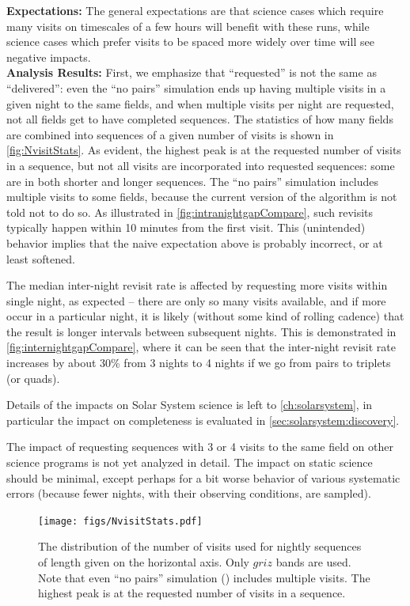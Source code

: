 {\bf Expectations:} The general expectations are that science cases
which require many visits on timescales of a few hours will benefit
with these runs, while science cases which prefer visits to be spaced
more widely over time will see negative impacts.\\

{\bf Analysis Results:}
First, we emphasize that ``requested'' is not the same as
``delivered'': even the ``no pairs''
simulation  ends
up having multiple visits in a given night to the same fields, and
when multiple visits per night are requested, not all fields get to
have completed sequences. The statistics of how many fields are
combined into sequences of a given number of visits is shown in
\autoref{fig:NvisitStats}.  As evident, the highest peak is at the
requested number of visits in a sequence, but not all visits are
incorporated into requested sequences: some are in both shorter and
longer sequences. The ``no pairs'' simulation includes
multiple visits to some fields, because the current
version of the algorithm is not told not to do so. As illustrated in
\autoref{fig:intranightgapCompare}, such revisits typically happen
within 10 minutes from the first visit. This (unintended) behavior
implies that the naive expectation above is probably incorrect, or at
least softened.

The median inter-night revisit rate is affected by requesting more
visits within single night, as expected -- there are only so many
visits available, and if more occur in a particular night, it is
likely (without some kind of rolling cadence) that the result is
longer intervals between subsequent nights. This is demonstrated in
\autoref{fig:internightgapCompare}, where it can be seen that the
inter-night revisit rate increases by about 30\% from 3 nights to 4
nights if we go from pairs to triplets (or quads).

Details of the impacts on Solar System science is
left to \autoref{ch:solarsystem}, in particular the impact on
completeness is evaluated in \autoref{sec:solarsystem:discovery}.

The impact of requesting sequences with 3 or 4 visits to the same
field on other science programs is not yet analyzed in detail.  The
impact on static science should be minimal, except perhaps for a bit
worse behavior of various systematic errors (because fewer nights,
with their observing conditions, are sampled).

\begin{figure}[t!]
\vskip -2.5in
\texttt{[image: figs/NvisitStats.pdf]}
\vskip -2.7in
\caption{The distribution of the number of visits used for nightly sequences of
length given on the horizontal axis. Only $griz$ bands are used. Note that even
``no pairs'' simulation ()
includes multiple visits. The highest peak is at the
requested number of visits in a sequence.}
\label{fig:NvisitStats}
\end{figure}

